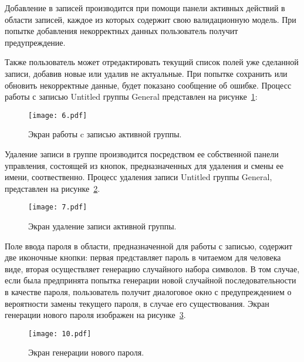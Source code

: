 Добавление в записей производится при помощи панели активных действий в области записей, каждое из которых содержит свою валидационную модель. При попытке добавления некорректных данных пользователь получит предупреждение.

Также пользователь может отредактировать текущий список полей уже сделанной записи, добавив новые или удалив не актуальные. При попытке сохранить или обновить некорректные данные, будет показано сообщение об ошибке. Процесс работы с записью Untitled группы General представлен на рисунке~\ref{fig:document:created_entry:six}:
\begin{figure}[ht]
\centering
  \texttt{[image: 6.pdf]}
  \caption{ Экран работы c записью активной группы. }
  \label{fig:document:created_entry:six}
\end{figure}

Удаление записи в группе производится посредством ее собственной панели управления, состоящей из кнопок, предназначенных для удаления и смены ее имени, соотвественно. Процесс удаления записи Untitled группы General, представлен на рисунке~\ref{fig:document:created_entry:seven}.
\begin{figure}[ht]
\centering
  \texttt{[image: 7.pdf]}
  \caption{ Экран удаление записи активной группы. }
  \label{fig:document:created_entry:seven}
\end{figure}

\newpage

Поле ввода пароля в области, предназначенной для работы с записью, содержит две иконочные кнопки: первая представляет пароль в читаемом для человека виде, вторая осуществляет генерацию случайного набора символов. В том случае, если была предпринята попытка генерации новой случайной последовательности в качестве пароля, пользователь получит диалоговое окно с предупреждением о вероятности замены текущего пароля, в случае его существования. Экран генерации нового пароля изображен на рисунке~\ref{fig:document:created_entry:ten}.

\begin{figure}[ht]
\centering
  \texttt{[image: 10.pdf]}
  \caption{ Экран генерации нового пароля. }
  \label{fig:document:created_entry:ten}
\end{figure}